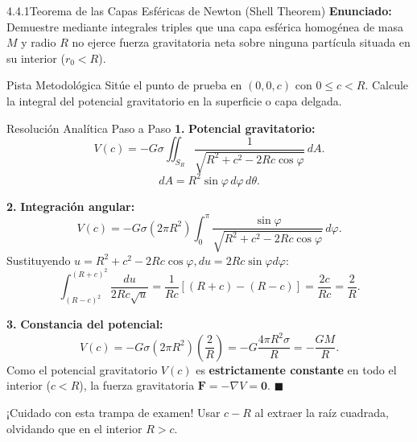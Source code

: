 \documentclass[11pt,a4paper]{article}
\begin{document}
\begin{nivelbox}{4.4.1}{Teorema de las Capas Esféricas de Newton (Shell Theorem)}
\textbf{Enunciado:}\\
Demuestre mediante integrales triples que una capa esférica homogénea de masa $M$ y radio $R$ no ejerce fuerza gravitatoria neta sobre ninguna partícula situada en su interior ($r_0 < R$).

\begin{observacionbox}{Pista Metodológica}
Sitúe el punto de prueba en $(0,0,c)$ con $0 \le c < R$. Calcule la integral del potencial gravitatorio en la superficie o capa delgada.
\end{observacionbox}

\begin{ejerciciobox}{Resolución Analítica Paso a Paso}
\smallskip\noindent\textbf{1.} \textbf{Potencial gravitatorio:}
\[V(c) = -G \sigma \iint_{S_R} \frac{1}{\sqrt{R^2 + c^2 - 2Rc\cos\varphi}} \, dA.\]
\[dA = R^2 \sin\varphi \, d\varphi \, d\theta.\]

\smallskip\noindent\textbf{2.} \textbf{Integración angular:}
\[V(c) = -G \sigma (2\pi R^2) \int_0^\pi \frac{\sin\varphi}{\sqrt{R^2 + c^2 - 2Rc\cos\varphi}} \, d\varphi.\]
Sustituyendo $u = R^2 + c^2 - 2Rc\cos\varphi, du = 2Rc\sin\varphi d\varphi$:
\[\int_{(R-c)^2}^{(R+c)^2} \frac{du}{2Rc \sqrt{u}} = \frac{1}{Rc} [ (R + c) - (R - c) ] = \frac{2c}{Rc} = \frac{2}{R}.\]

\smallskip\noindent\textbf{3.} \textbf{Constancia del potencial:}
\[V(c) = -G \sigma (2\pi R^2) \left( \frac{2}{R} \right) = -G \frac{4\pi R^2 \sigma}{R} = -\frac{GM}{R}.\]
Como el potencial gravitatorio $V(c)$ es \textbf{estrictamente constante} en todo el interior ($c < R$), la fuerza gravitatoria $\mathbf{F} = -\nabla V = \mathbf{0}$. $\blacksquare$
\end{ejerciciobox}

\begin{errorbox}{¡Cuidado con esta trampa de examen!}
Usar $c - R$ al extraer la raíz cuadrada, olvidando que en el interior $R > c$.
\end{errorbox}
\end{nivelbox}
\bigskip
\end{document}
